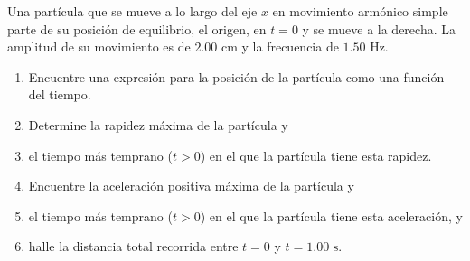 \item Una partícula que se mueve a lo largo del eje $x$ en movimiento armónico simple parte de su posición de equilibrio, el origen, en $t = 0$ y se mueve a la derecha. La amplitud de su movimiento es de $2.00\text{ cm}$ y la frecuencia de $1.50\text{ Hz}$.
\begin{enumerate}
    \item Encuentre una expresión para la posición de la partícula como una función del tiempo.
    \item Determine la rapidez máxima de la partícula y
    \item el tiempo más temprano ($t > 0$) en el que la partícula tiene esta rapidez.
    \item Encuentre la aceleración positiva máxima de la partícula y
    \item el tiempo más temprano ($t > 0$) en el que la partícula tiene esta aceleración, y
    \item halle la distancia total recorrida entre $t = 0$ y $t = 1.00\text{ s}$.
\end{enumerate}